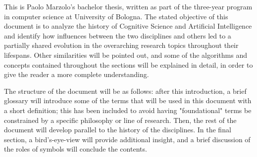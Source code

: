 \documentclass[../main.tex]{subfiles}
\begin{document}
This is Paolo Marzolo's bachelor thesis, written as part of the three-year program in computer science at University of Bologna. The stated objective of this document is to analyze the history of Cognitive Science and Artificial Intelligence and identify how influences between the two disciplines and others led to a partially shared evolution in the overarching research topics throughout their lifespans. Other similarities will be pointed out, and some of the algorithms and concepts contained throughout the sections will be explained in detail, in order to give the reader a more complete understanding.

The structure of the document will be as follows: after this introduction, a brief glossary will introduce some of the terms that will be used in this document with a short definition; this has been included to avoid having "foundational" terms be constrained by a specific philosophy or line of research. Then, the rest of the document will develop parallel to the history of the disciplines. In the final section, a bird's-eye-view will provide additional insight, and a brief discussion of the roles of symbols will conclude the contents.
\end{document}
